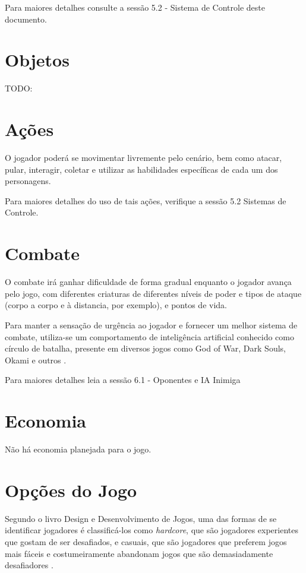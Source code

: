 Para maiores detalhes consulte a sessão 5.2 - Sistema de Controle deste documento.

\section{Objetos}

TODO:

\section{Ações}
O jogador poderá se movimentar livremente pelo cenário, bem como atacar, pular, interagir, coletar e utilizar as habilidades específicas de cada um dos personagens.

Para maiores detalhes do uso de tais ações, verifique a sessão 5.2 Sistemas de Controle.

\section{Combate}
O combate irá ganhar dificuldade de forma gradual enquanto o jogador avança pelo jogo, com diferentes criaturas de diferentes níveis de poder e tipos de ataque (corpo a corpo e à distancia, por exemplo), e pontos de vida. 

Para manter a sensação de urgência ao jogador e fornecer um melhor sistema de combate, utiliza-se um comportamento de inteligência artificial conhecido como círculo de batalha, presente em diversos jogos como God of War, Dark Souls, Okami e outros \cite{BattleCi}.

Para maiores detalhes leia a sessão 6.1 - Oponentes e IA Inimiga

\section{Economia}

Não há economia planejada para o jogo.

\section{Opções do Jogo}

Segundo o livro Design e Desenvolvimento de Jogos, uma das formas de se identificar jogadores é classificá-los como \textit{hardcore}, que são jogadores experientes que gostam de ser desafiados, e casuais, que são jogadores que preferem jogos mais fáceis e costumeiramente abandonam jogos que são demasiadamente desafiadores \cite{pradadesign}. 

